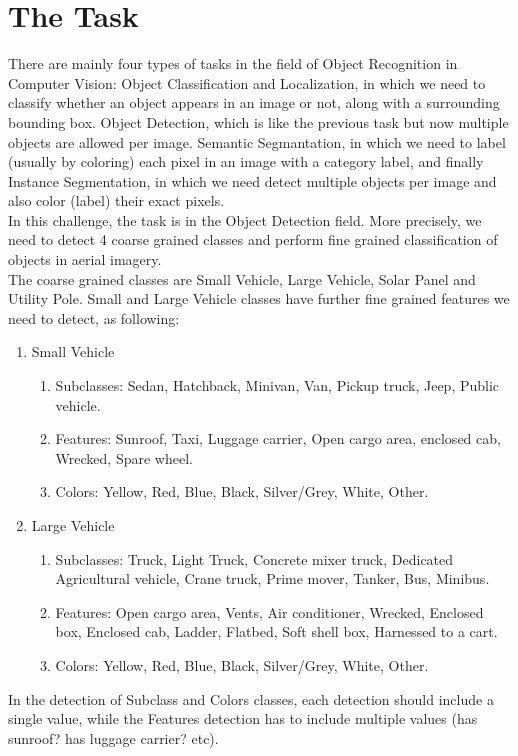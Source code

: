 \documentclass[]{article}
\begin{document}
\section{The Task}
There are mainly four types of tasks in the field of Object Recognition in Computer Vision: Object Classification and Localization, in which we need to classify whether an object appears in an image or not, along with a surrounding bounding box. Object Detection, which is like the previous task but now multiple objects are allowed per image. Semantic Segmantation, in which we need to label (usually by coloring) each pixel in an image with a category label, and finally Instance Segmentation, in which we need detect multiple objects per image and also color (label) their exact pixels.\\
In this challenge, the task is in the Object Detection field. More precisely, we need to detect 4 coarse grained classes and perform fine grained classification of objects in aerial imagery.\\
The coarse grained classes are Small Vehicle, Large Vehicle, Solar Panel and Utility Pole. Small and Large Vehicle classes have further fine grained features we need to detect, as following:\\
\begin{enumerate}
\item Small Vehicle
	\begin{enumerate}
		\item Subclasses: Sedan, Hatchback, Minivan, Van, Pickup truck, Jeep, Public vehicle.
		\item Features: Sunroof, Taxi, Luggage carrier, Open cargo area, enclosed cab, Wrecked, Spare wheel.
		\item Colors: Yellow, Red, Blue, Black, Silver/Grey, White, Other.
	\end{enumerate}
\item Large Vehicle
	\begin{enumerate}
	\item Subclasses: Truck, Light Truck, Concrete mixer truck, Dedicated Agricultural vehicle, Crane truck, Prime mover, Tanker, Bus, Minibus.
	\item Features: Open cargo area, Vents, Air conditioner, Wrecked, Enclosed box, Enclosed cab, Ladder, Flatbed, Soft shell box, Harnessed to a cart.
	\item Colors: Yellow, Red, Blue, Black, Silver/Grey, White, Other.
	\end{enumerate}
\end{enumerate}
In the detection of Subclass and Colors classes, each detection should include a single value, while the Features detection has to include multiple values (has sunroof? has luggage carrier? etc).
\end{document}
